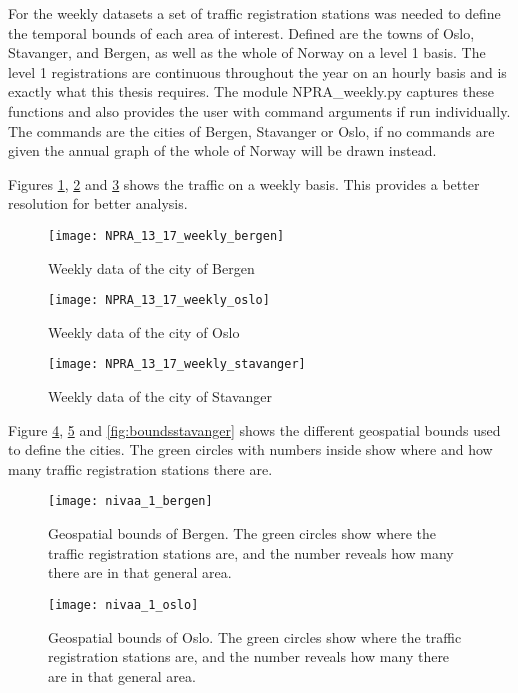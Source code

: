 For the weekly datasets a set of traffic registration stations was needed to define the temporal bounds of each area of interest. Defined are the towns of Oslo, Stavanger, and Bergen, as well as the whole of Norway on a level 1 basis. The level 1 registrations are continuous throughout the year on an hourly basis and is exactly what this thesis requires. The module NPRA\_weekly.py captures these functions and also provides the user with command arguments if run individually. The commands are the cities of Bergen, Stavanger or Oslo, if no commands are given the annual graph of the whole of Norway will be drawn instead.

Figures \ref{fig:weeklybergen}, \ref{fig:weeklyoslo} and \ref{fig:weeklystavanger} shows the traffic on a weekly basis. This provides a better resolution for better analysis.
\begin{figure}[ht]
\texttt{[image: NPRA\_13\_17\_weekly\_bergen]}
\centering
\caption{Weekly data of the city of Bergen}
\label{fig:weeklybergen}
\end{figure}

\begin{figure}[ht]
\texttt{[image: NPRA\_13\_17\_weekly\_oslo]}
\centering
\caption{Weekly data of the city of Oslo}
\label{fig:weeklyoslo}
\end{figure}

\begin{figure}[ht]
\texttt{[image: NPRA\_13\_17\_weekly\_stavanger]}
\centering
\caption{Weekly data of the city of Stavanger}
\label{fig:weeklystavanger}
\end{figure}

Figure \ref{fig:boundsbergen}, \ref{fig:boundsoslo} and \ref{fig:boundsstavanger} shows the different geospatial bounds used to define the cities. The green circles with numbers inside show where and how many traffic registration stations there are.

\begin{figure}[ht]
\texttt{[image: nivaa\_1\_bergen]}
\centering
\caption{Geospatial bounds of Bergen. The green circles show where the traffic registration stations are, and the number reveals how many there are in that general area.}
\label{fig:boundsbergen}
\end{figure}

\begin{figure}[ht]
\texttt{[image: nivaa\_1\_oslo]}
\centering
\caption{Geospatial bounds of Oslo. The green circles show where the traffic registration stations are, and the number reveals how many there are in that general area.}
\label{fig:boundsoslo}
\end{figure}

